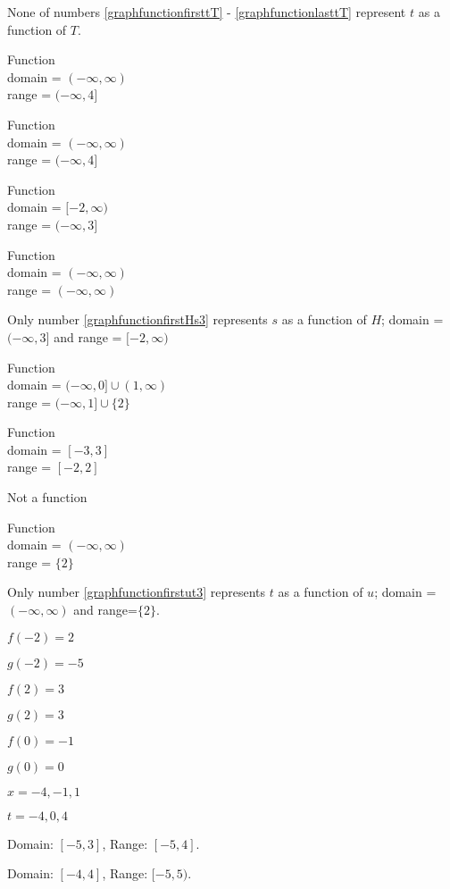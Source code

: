 \begin{tasks}[resume]
\task None of numbers \ref{graphfunctionfirsttT} - \ref{graphfunctionlasttT}  represent $t$ as a function of $T$.

\task  Function \\ domain = $(-\infty, \infty)$ \\ range = $(-\infty, 4]$

\task  Function \\ domain = $(-\infty, \infty)$ \\ range = $(-\infty, 4]$

\task  Function \\  domain =  $[-2, \infty)$  \\ range =   $(-\infty, 3]$

\task  Function \\ domain = $(-\infty, \infty)$ \\ range = $(-\infty, \infty)$

\task Only number \ref{graphfunctionfirstHs3} represents $s$ as a function of $H$;  domain =  $(-\infty, 3]$  and range =   $[-2, \infty)$


\task  Function \\  domain =  $(-\infty, 0] \cup (1, \infty)$ \\ range =  $(-\infty, 1] \cup \{ 2\}$

\task  Function \\  domain =  $[-3,3]$ \\ range =  $[-2,2]$

\task   Not a function

\task  Function \\ domain = $(-\infty, \infty)$ \\ range = $\{2\}$

\task  Only number \ref{graphfunctionfirstut3} represents $t$ as a function of $u$;  domain = $(-\infty, \infty)$ and range=$\{2 \}$.

\task  $f(-2) = 2$

\task $g(-2) = -5$

\task $f(2) = 3$

\task  $g(2) = 3$

\task $f(0) = -1$

\task $g(0) = 0$

\task  $x  = -4, -1, 1$

\task  $t = -4, 0, 4$

\task*  Domain:  $[-5,3]$,  Range:  $[-5,4]$.

\task  Domain:  $[-4,4]$,  Range:  $[-5,5)$.

\end{tasks}


